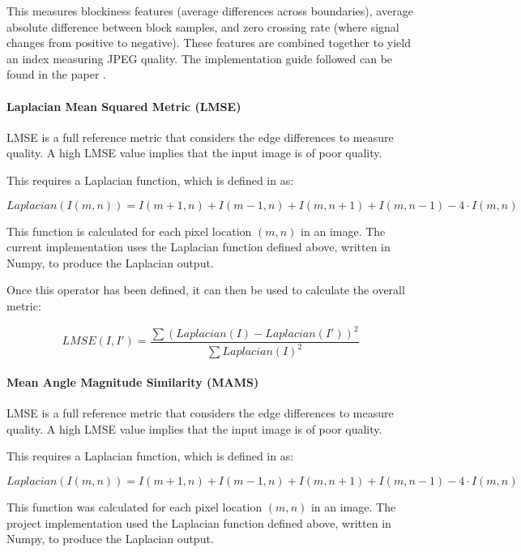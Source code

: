 \documentclass[12pt,a4paper]{article}
\begin{document}
                This measures blockiness features (average differences across boundaries), average absolute difference between block samples, and zero crossing rate (where signal changes from positive to negative). 
                These features are combined together to yield an index measuring JPEG quality. The implementation guide followed can be found in the paper \cite{JQIPaper}.
            
                \paragraph{Laplacian Mean Squared Metric (LMSE)}
                LMSE is a full reference metric that considers the edge differences to measure quality. A high LMSE value implies that the input image is of poor quality. 
                    
                This requires a Laplacian function, which is defined in \cite{LMSEPaper} as:

                $$Laplacian(I(m, n)) = I(m+1, n) + I(m-1, n) + I(m, n+1) + I(m, n-1) - 4\cdot I(m, n)$$

                This function is calculated for each pixel location $(m, n)$ in an image. The current implementation uses the Laplacian function defined above, written in Numpy, to produce the Laplacian output. 
                \cite{LMSEPaper}

                Once this operator has been defined, it can then be used to calculate the overall metric: 

                $$LMSE(I, I') = \frac{\sum (Laplacian(I) - Laplacian(I'))^2}{\sum Laplacian(I)^2}$$
                
            \paragraph{Mean Angle Magnitude Similarity (MAMS)}
            LMSE is a full reference metric that considers the edge differences to measure quality. A high LMSE value implies that the input image is of poor quality. 
                
            This requires a Laplacian function, which is defined in \cite{LMSEPaper} as:

            $$Laplacian(I(m, n)) = I(m+1, n) + I(m-1, n) + I(m, n+1) + I(m, n-1) - 4\cdot I(m, n)$$

            This function was calculated for each pixel location $(m, n)$ in an image. The project implementation used the Laplacian function defined above, written in Numpy, to produce the Laplacian output. 
            \cite{LMSEPaper}
\end{document}
